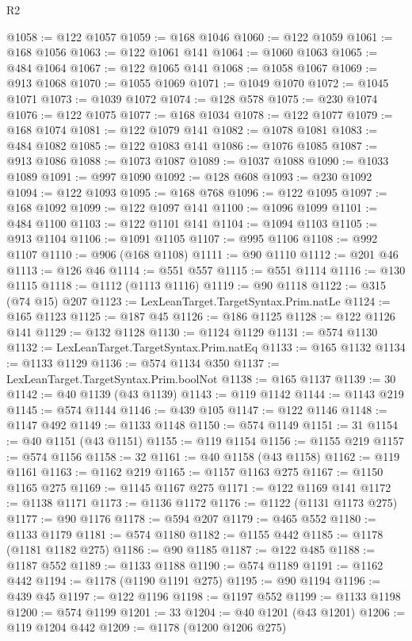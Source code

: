 \begin{lexlean}{R2}
\begin{coremodule}
@1058 := @122 @1057
@1059 := @168 @1046
@1060 := @122 @1059
@1061 := @168 @1056
@1063 := @122 @1061 @141
@1064 := @1060 @1063
@1065 := @484 @1064
@1067 := @122 @1065 @141
@1068 := @1058 @1067
@1069 := @913 @1068
@1070 := @1055 @1069
@1071 := @1049 @1070
@1072 := @1045 @1071
@1073 := @1039 @1072
@1074 := @128 @578
@1075 := @230 @1074
@1076 := @122 @1075
@1077 := @168 @1034
@1078 := @122 @1077
@1079 := @168 @1074
@1081 := @122 @1079 @141
@1082 := @1078 @1081
@1083 := @484 @1082
@1085 := @122 @1083 @141
@1086 := @1076 @1085
@1087 := @913 @1086
@1088 := @1073 @1087
@1089 := @1037 @1088
@1090 := @1033 @1089
@1091 := @997 @1090
@1092 := @128 @608
@1093 := @230 @1092
@1094 := @122 @1093
@1095 := @168 @768
@1096 := @122 @1095
@1097 := @168 @1092
@1099 := @122 @1097 @141
@1100 := @1096 @1099
@1101 := @484 @1100
@1103 := @122 @1101 @141
@1104 := @1094 @1103
@1105 := @913 @1104
@1106 := @1091 @1105
@1107 := @995 @1106
@1108 := @992 @1107
@1110 := @906 (@168 @1108)
@1111 := @90 @1110
@1112 := @201 @46
@1113 := @126 @46
@1114 := @551 @557
@1115 := @551 @1114
@1116 := @130 @1115
@1118 := @1112 (@1113 @1116)
@1119 := @90 @1118
@1122 := @315 (@74 @15) @207
@1123 := LexLeanTarget.TargetSyntax.Prim.natLe
@1124 := @165 @1123
@1125 := @187 @45
@1126 := @186 @1125
@1128 := @122 @1126 @141
@1129 := @132 @1128
@1130 := @1124 @1129
@1131 := @574 @1130
@1132 := LexLeanTarget.TargetSyntax.Prim.natEq
@1133 := @165 @1132
@1134 := @1133 @1129
@1136 := @574 @1134 @350
@1137 := LexLeanTarget.TargetSyntax.Prim.boolNot
@1138 := @165 @1137
@1139 := 30
@1142 := @40 @1139 (@43 @1139)
@1143 := @119 @1142
@1144 := @1143 @219
@1145 := @574 @1144
@1146 := @439 @105
@1147 := @122 @1146
@1148 := @1147 @492
@1149 := @1133 @1148
@1150 := @574 @1149
@1151 := 31
@1154 := @40 @1151 (@43 @1151)
@1155 := @119 @1154
@1156 := @1155 @219
@1157 := @574 @1156
@1158 := 32
@1161 := @40 @1158 (@43 @1158)
@1162 := @119 @1161
@1163 := @1162 @219
@1165 := @1157 @1163 @275
@1167 := @1150 @1165 @275
@1169 := @1145 @1167 @275
@1171 := @122 @1169 @141
@1172 := @1138 @1171
@1173 := @1136 @1172
@1176 := @1122 (@1131 @1173 @275)
@1177 := @90 @1176
@1178 := @594 @207
@1179 := @465 @552
@1180 := @1133 @1179
@1181 := @574 @1180
@1182 := @1155 @442
@1185 := @1178 (@1181 @1182 @275)
@1186 := @90 @1185
@1187 := @122 @485
@1188 := @1187 @552
@1189 := @1133 @1188
@1190 := @574 @1189
@1191 := @1162 @442
@1194 := @1178 (@1190 @1191 @275)
@1195 := @90 @1194
@1196 := @439 @45
@1197 := @122 @1196
@1198 := @1197 @552
@1199 := @1133 @1198
@1200 := @574 @1199
@1201 := 33
@1204 := @40 @1201 (@43 @1201)
@1206 := @119 @1204 @442
@1209 := @1178 (@1200 @1206 @275)

\end{coremodule}
\end{lexlean}
